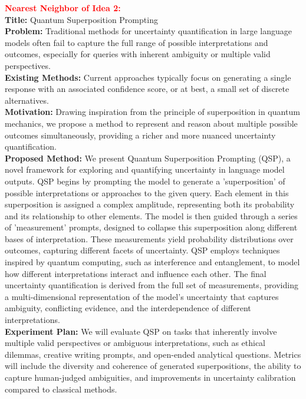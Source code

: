 \textbf{\textcolor{red}{Nearest Neighbor of Idea 2:}} \\
\textbf{Title:} Quantum Superposition Prompting \\
\textbf{Problem:} Traditional methods for uncertainty quantification in large language models often fail to capture the full range of possible interpretations and outcomes, especially for queries with inherent ambiguity or multiple valid perspectives. \\
\textbf{Existing Methods:} Current approaches typically focus on generating a single response with an associated confidence score, or at best, a small set of discrete alternatives. \\
\textbf{Motivation:} Drawing inspiration from the principle of superposition in quantum mechanics, we propose a method to represent and reason about multiple possible outcomes simultaneously, providing a richer and more nuanced uncertainty quantification. \\
\textbf{Proposed Method:} We present Quantum Superposition Prompting (QSP), a novel framework for exploring and quantifying uncertainty in language model outputs. QSP begins by prompting the model to generate a 'superposition' of possible interpretations or approaches to the given query. Each element in this superposition is assigned a complex amplitude, representing both its probability and its relationship to other elements. The model is then guided through a series of 'measurement' prompts, designed to collapse this superposition along different bases of interpretation. These measurements yield probability distributions over outcomes, capturing different facets of uncertainty. QSP employs techniques inspired by quantum computing, such as interference and entanglement, to model how different interpretations interact and influence each other. The final uncertainty quantification is derived from the full set of measurements, providing a multi-dimensional representation of the model's uncertainty that captures ambiguity, conflicting evidence, and the interdependence of different interpretations. \\
\textbf{Experiment Plan:} We will evaluate QSP on tasks that inherently involve multiple valid perspectives or ambiguous interpretations, such as ethical dilemmas, creative writing prompts, and open-ended analytical questions. Metrics will include the diversity and coherence of generated superpositions, the ability to capture human-judged ambiguities, and improvements in uncertainty calibration compared to classical methods.


